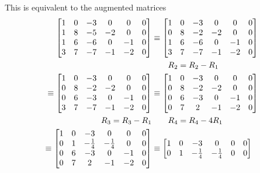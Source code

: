 \documentclass{../mathhomework}
\newenvironment{Mat}{\begin{bmatrix}}{\end{bmatrix}}
\begin{document}
\begin{problem}[1.6\#7]
    This is equivalent to the augmented matrices
    \begin{align*}
        \begin{Mat}
            1 & 0 & -3 & 0 & 0 & 0 \\
            1 & 8 & -5 & -2 & 0 & 0 \\
            1 & 6 & -6 & 0 & -1 & 0 \\
            3 & 7 & -7 & -1 & -2 & 0
        \end{Mat} & \equiv
        \begin{Mat}
            1 & 0 & -3 & 0 & 0 & 0 \\
            0 & 8 & -2 & -2 & 0 & 0 \\
            1 & 6 & -6 & 0 & -1 & 0 \\
            3 & 7 & -7 & -1 & -2 & 0
        \end{Mat} 
        \\ & \qquad{} R_2 = R_2 - R_1 \\
        \equiv \begin{Mat}
            1 & 0 & -3 & 0 & 0 & 0 \\
            0 & 8 & -2 & -2 & 0 & 0 \\
            0 & 6 & -3 & 0 & -1 & 0 \\
            3 & 7 & -7 & -1 & -2 & 0
        \end{Mat} 
        & \equiv \begin{Mat}
            1 & 0 & -3 & 0 & 0 & 0 \\
            0 & 8 & -2 & -2 & 0 & 0 \\
            0 & 6 & -3 & 0 & -1 & 0 \\
            0 & 7 & 2 & -1 & -2 & 0
        \end{Mat} \\
        R_3 = R_3 - R_1 & \qquad{} R_4 = R_4 - 4R_1 \\
        \equiv \begin{Mat}
            1 & 0 & -3 & 0 & 0 & 0 \\
            0 & 1 & -\frac{1}{4} & -\frac{1}{4} & 0 & 0 \\
            0 & 6 & -3 & 0 & -1 & 0 \\
            0 & 7 & 2 & -1 & -2 & 0
        \end{Mat}
        & \equiv \begin{Mat}
            1 & 0 & -3 & 0 & 0 & 0 \\
            0 & 1 & -\frac{1}{4} & -\frac{1}{4} & 0 & 0 \\

\end{Mat}
\end{align*}
\end{problem}
\end{document}
